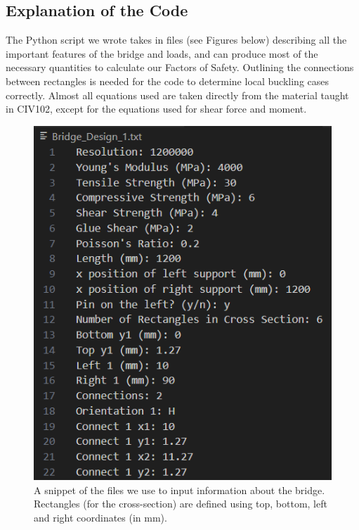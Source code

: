 \documentclass[11pt]{article}
\begin{document}
\subsection{Explanation of the Code}
\par The Python script we wrote takes in files (see Figures below) describing all the important features of the bridge and loads, and can produce most of the necessary quantities to calculate our Factors of Safety. Outlining the connections between rectangles is needed for the code to determine local buckling cases correctly. Almost all equations used are taken directly from the material taught in CIV102, except for the equations used for shear force and moment. 

\begin{figure}[h]
\begin{minipage}[c]{0.45\linewidth}
\centering
\includegraphics[scale = 0.5]{images/Code File Input Snippet 1.png}
\caption{A snippet of the files we use to input information about the bridge. Rectangles (for the cross-section) are defined using top, bottom, left and right coordinates (in mm).}
\end{minipage}
\hspace{2mm}
\begin{minipage}[c]{0.45\linewidth}

\end{minipage}
\end{figure}
\end{document}
